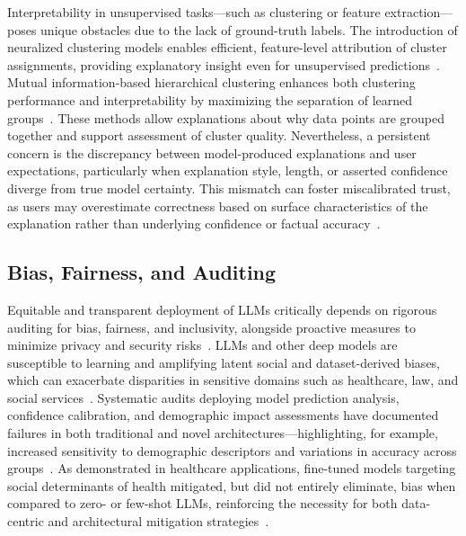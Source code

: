 \documentclass[sigconf]{acmart}
\begin{document}
Interpretability in unsupervised tasks---such as clustering or feature extraction---poses unique obstacles due to the lack of ground-truth labels. The introduction of neuralized clustering models enables efficient, feature-level attribution of cluster assignments, providing explanatory insight even for unsupervised predictions~\cite{ref83}. Mutual information-based hierarchical clustering enhances both clustering performance and interpretability by maximizing the separation of learned groups~\cite{ref85}. These methods allow explanations about why data points are grouped together and support assessment of cluster quality. Nevertheless, a persistent concern is the discrepancy between model-produced explanations and user expectations, particularly when explanation style, length, or asserted confidence diverge from true model certainty. This mismatch can foster miscalibrated trust, as users may overestimate correctness based on surface characteristics of the explanation rather than underlying confidence or factual accuracy~\cite{ref35, ref49, ref81}.

\subsection{Bias, Fairness, and Auditing}

Equitable and transparent deployment of LLMs critically depends on rigorous auditing for bias, fairness, and inclusivity, alongside proactive measures to minimize privacy and security risks~\cite{ref1, ref2, ref3, ref10, ref14, ref21, ref22, ref23, ref36, ref42, ref43, ref44, ref46, ref49, ref52, ref53, ref65, ref73}. LLMs and other deep models are susceptible to learning and amplifying latent social and dataset-derived biases, which can exacerbate disparities in sensitive domains such as healthcare, law, and social services~\cite{ref3, ref10, ref21, ref22, ref23, ref42, ref43, ref44, ref49, ref52, ref53, ref65}. Systematic audits deploying model prediction analysis, confidence calibration, and demographic impact assessments have documented failures in both traditional and novel architectures---highlighting, for example, increased sensitivity to demographic descriptors and variations in accuracy across groups~\cite{ref22, ref44, ref49, ref53}. As demonstrated in healthcare applications, fine-tuned models targeting social determinants of health mitigated, but did not entirely eliminate, bias when compared to zero- or few-shot LLMs, reinforcing the necessity for both data-centric and architectural mitigation strategies~\cite{ref2, ref22, ref23}.
\end{document}
